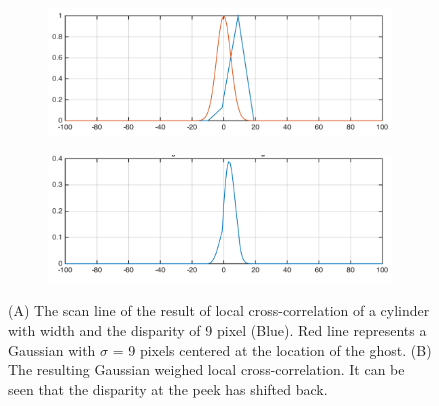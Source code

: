 \begin{figure}[htbp]
    \centering
    \begin{subfigure}[b]{0.9\textwidth}
        \includegraphics[width=\textwidth]{./Template_Figures/normal_ccr}
        \caption{}\label{fig:normal_ccr}
    \end{subfigure}

    \begin{subfigure}[b]{0.9\textwidth}
        \includegraphics[width=\textwidth]{./Template_Figures/windowed_ccr}
        \caption{}\label{fig:windowed_ccr}
    \end{subfigure}

    \caption{(A) The scan line of the result of local cross-correlation of a cylinder with width and the disparity of 9 pixel (Blue). Red line represents a Gaussian with $\sigma$ = 9 pixels centered at the location of the ghost. (B) The resulting Gaussian weighed local cross-correlation. It can be seen that the disparity at the peek has shifted back.\label{fig:windowed_ccr_f}}
\end{figure}

